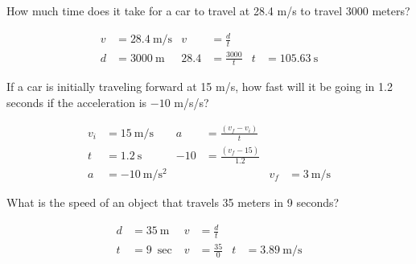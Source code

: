 \documentclass[10pt]{exam}
\newcommand{\ansblank}{
  \ifprintanswers
  \else
    \ku
  \fi
  \vs
}
\begin{document}
\begin{questions}
\begin{multicols}{2}
    \end{multicols}


    \question
    How much time does it take for a car to travel at 28.4 m/s to travel 3000 meters? 
    \begin{solution}
      \begin{align*}
        v &= \SI{28.4}{\meter\per\second} 
                            & v &= \frac{d}{t} \\
        d &= \SI{3000}{\meter}
                            & 28.4 &= \frac{3000}{t} &
                              t &= \SI{105.63}{\second}
      \end{align*}
    \end{solution}
    \ansblank

  \pagebreak


  \question
    If a car is initially traveling forward at 15 m/s, how fast will it be going in 1.2 seconds if the acceleration is $-10$ m/s/s?
    \begin{solution}
      \begin{align*}
        v_i &= \SI{15}{\meter\per\second} & 
                a &= \frac{\left(v_f-v_i\right)}{t}  \\
        t &= \SI{1.2}{\second} &
              -10 &= \frac{\left(v_f-15\right)}{1.2} \\
        a &= \SI{-10}{\meter\per\second^2} &&&
                      v_f &= \SI{3}{\meter\per\second}
      \end{align*}
    \end{solution}
    \ansblank

    \question
    What is the speed of an object that travels 35 meters in 9 seconds? 
    \begin{solution}
      \begin{align*}
        d &= \SI{35}{\meter} 
                            & v &= \frac{d}{t} \\
        t &= \SI{9}{\sec}
                            & v &= \frac{35}{0} &
                       t &= \SI{3.89}{\meter\per\second}
      \end{align*}
    \end{solution}
    \ansblank



\end{questions}
\end{document}
